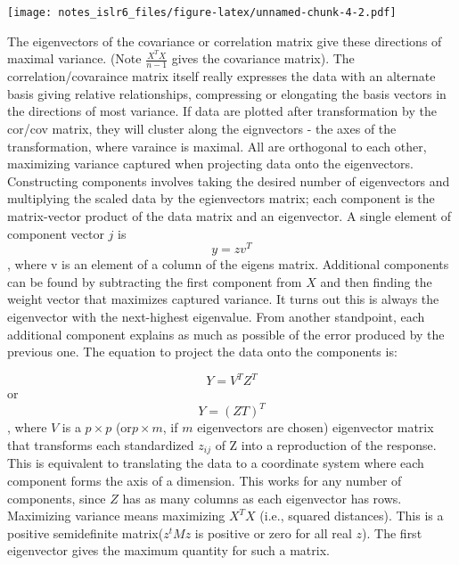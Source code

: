 \documentclass[
]{article}
\newenvironment{Shaded}{\begin{snugshade}}{\end{snugshade}}
\newcommand{\DataTypeTok}[1]{\textcolor[rgb]{0.13,0.29,0.53}{#1}}
\newcommand{\DecValTok}[1]{\textcolor[rgb]{0.00,0.00,0.81}{#1}}
\newcommand{\KeywordTok}[1]{\textcolor[rgb]{0.13,0.29,0.53}{\textbf{#1}}}
\newcommand{\NormalTok}[1]{#1}
\newcommand{\OperatorTok}[1]{\textcolor[rgb]{0.81,0.36,0.00}{\textbf{#1}}}
\newcommand{\StringTok}[1]{\textcolor[rgb]{0.31,0.60,0.02}{#1}}
\begin{document}
\begin{Shaded}
\begin{Highlighting}[]
{{\StringTok{  }\KeywordTok{geom_segment}\NormalTok{(}\KeywordTok{aes}\NormalTok{(}\DataTypeTok{xend =}\DecValTok{0}\NormalTok{, }\DataTypeTok{yend =} \DecValTok{0}\NormalTok{, }\DataTypeTok{x =} \DecValTok{0}\NormalTok{, }\DataTypeTok{y =} \DecValTok{1}\NormalTok{), }\DataTypeTok{col =} \StringTok{"green"}\NormalTok{) }\OperatorTok{+}
\StringTok{  }\KeywordTok{geom_segment}\NormalTok{(}\KeywordTok{aes}\NormalTok{(}\DataTypeTok{xend =}\DecValTok{0}\NormalTok{, }\DataTypeTok{yend =} \DecValTok{0}\NormalTok{, }\DataTypeTok{x =} \DecValTok{1}\NormalTok{, }\DataTypeTok{y =} \DecValTok{0}\NormalTok{), }\DataTypeTok{col =} \StringTok{"red"}\NormalTok{) }\OperatorTok{+}
\StringTok{  }\KeywordTok{labs}\NormalTok{(}\DataTypeTok{title =} \StringTok{"Eigenvectors after Matrix Transformation"}\NormalTok{)}
\end{Highlighting}
\end{Shaded}

\texttt{[image: notes\_islr6\_files/figure-latex/unnamed-chunk-4-2.pdf]}

The eigenvectors of the covariance or correlation matrix give these
directions of maximal variance. (Note \(\frac{X^TX}{n-1}\) gives the
covariance matrix). The correlation/covaraince matrix itself really
expresses the data with an alternate basis giving relative
relationships, compressing or elongating the basis vectors in the
directions of most variance. If data are plotted after transformation by
the cor/cov matrix, they will cluster along the eignvectors - the axes
of the transformation, where varaince is maximal. All are orthogonal to
each other, maximizing variance captured when projecting data onto the
eigenvectors. Constructing components involves taking the desired number
of eigenvectors and multiplying the scaled data by the egienvectors
matrix; each component is the matrix-vector product of the data matrix
and an eigenvector. A single element of component vector \(j\) is
\[y = zv^T\], where v is an element of a column of the eigens matrix.
Additional components can be found by subtracting the first component
from \(X\) and then finding the weight vector that maximizes captured
variance. It turns out this is always the eigenvector with the
next-highest eigenvalue. From another standpoint, each additional
component explains as much as possible of the error produced by the
previous one. The equation to project the data onto the components is:

\[Y = V^TZ^T\] or \[Y = (ZT)^T\], where \(V\) is a \(p\times p\)
(or\(p\times{m}\), if \(m\) eigenvectors are chosen) eigenvector matrix
that transforms each standardized \(z_{ij}\) of Z into a reproduction of
the response. This is equivalent to translating the data to a coordinate
system where each component forms the axis of a dimension. This works
for any number of components, since \(Z\) has as many columns as each
eigenvector has rows. Maximizing variance means maximizing \(X^TX\)
(i.e., squared distances). This is a positive semidefinite
matrix(\(z^tMz\) is positive or zero for all real \(z\)). The first
eigenvector gives the maximum quantity for such a matrix.
\end{document}

